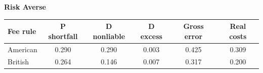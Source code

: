 \documentclass[10pt,border=5pt,varwidth=17cm]{standalone}
\begin{document}
\begingroup
\small
\setlength{\tabcolsep}{5pt}
\renewcommand{\arraystretch}{1.20}
\noindent\textbf{Risk Averse}\par\smallskip
\noindent\begin{tabularx}{\linewidth}{@{}>{\raggedright\arraybackslash}Xccccc@{}}
\toprule
\textbf{Fee rule} & \textbf{P shortfall} & \textbf{D nonliable} & \textbf{D excess} & \textbf{Gross error} & \textbf{Real costs} \\
\midrule
American & 0.290 & 0.290 & 0.003 & 0.425 & 0.309 \\
British & 0.264 & 0.146 & 0.007 & 0.317 & 0.200 \\
\bottomrule\end{tabularx}\par\medskip
\endgroup
\end{document}
